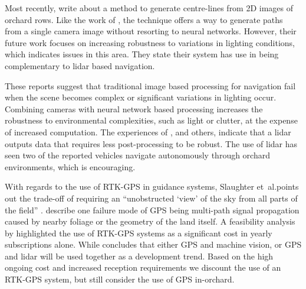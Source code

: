 \documentclass[preprint,authoryear,12pt]{elsarticle}
\begin{document}
        Most recently, \cite{Sharifi2015} write about a method to generate centre-lines from 2D images of orchard rows.
        Like the work of \cite{He2011}, the technique offers a way to generate paths from a single camera image without resorting to neural networks.
        However, their future work focuses on increasing robustness to variations in lighting conditions, which indicates issues in this area.
        They state their system has use in being complementary to lidar based navigation.

        These reports suggest that traditional image based processing for navigation fail when the scene becomes complex or significant variations in lighting occur.
        Combining cameras with neural network based processing increases the robustness to environmental complexities, such as light or clutter, at the expense of increased computation.
        The experiences of \cite{Scarfe2012}, and others, indicate that a lidar outputs data that requires less post-processing to be robust.
        The use of lidar has seen two of the reported vehicles navigate autonomously through orchard environments, which is encouraging.

        With regards to the use of RTK-GPS in guidance systems, Slaughter et~al.\@ points out the trade-off of requiring an ``unobstructed `view' of the sky from all parts of the field'' \citep{Slaughter2008}.
        \cite{Durrant-Whyte2005} describe one failure mode of GPS being multi-path signal propagation caused by nearby foliage or the geometry of the land itself.
        A feasibility analysis by \cite{Pedersen2006} highlighted the use of RTK-GPS systems as a significant cost in yearly subscriptions alone.
        While \cite{Li2009} concludes that either GPS and machine vision, or GPS and lidar will be used together as a development trend.
        Based on the high ongoing cost and increased reception requirements we discount the use of an RTK-GPS system, but still consider the use of GPS in-orchard.
\end{document}
